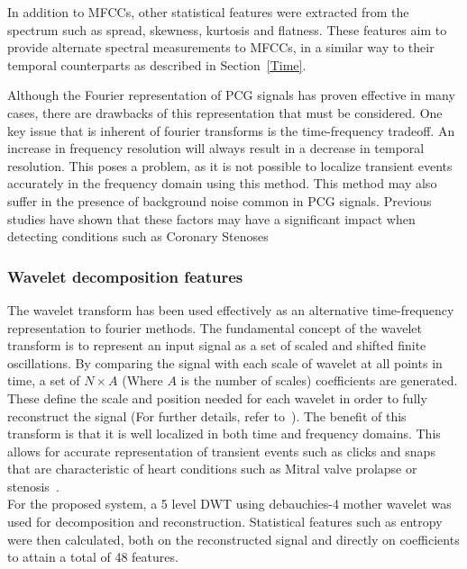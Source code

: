 \documentclass[titlepage, 12pt]{scrartcl} \usepackage{enumitem}
\begin{document}
In addition to MFCCs, other statistical features were extracted from the
spectrum such as spread, skewness, kurtosis and flatness. These features aim to
provide alternate spectral measurements to MFCCs, in a similar way to their
temporal counterparts as described in Section~\ref{Time}.

Although the Fourier representation of PCG signals has proven effective in many
cases, there are drawbacks of this representation that must be considered. One
key issue that is inherent of fourier transforms is the time-frequency
tradeoff. An increase in frequency resolution will always result in a decrease
in temporal resolution. This poses a problem, as it is not possible to localize
transient events accurately in the frequency domain using this method. This
method may also suffer in the presence of background noise common in PCG
signals. Previous studies have shown that these factors may have a significant
impact when detecting conditions such as Coronary
Stenoses~\parencite{Ergen2001, Akay1990}

\subsubsection{Wavelet decomposition features}
The wavelet transform has been used effectively as an alternative
time-frequency representation to fourier methods. The fundamental concept of
the wavelet transform is to represent an input signal as a set of scaled and
shifted finite oscillations. By comparing the signal with each scale of wavelet
at all points in time, a set of $N\times A$ (Where $A$ is the number of scales)
coefficients are generated. These define the scale and position needed for
each wavelet in order to fully reconstruct the signal (For further details,
refer to~\parencite{Polikar1994}). The benefit of this transform is that it is
well localized in both time and frequency domains. This allows for accurate
representation of transient events such as clicks and snaps that are
characteristic of heart conditions such as Mitral valve prolapse or
stenosis~\parencite{Brown2008}.\\
For the proposed system, a 5 level DWT using debauchies-4 mother wavelet was
used for decomposition and reconstruction. Statistical features such as entropy
were then calculated, both on the reconstructed signal and directly on
coefficients to attain a total of 48 features.~\parencite{Homsi2016}
\end{document}
